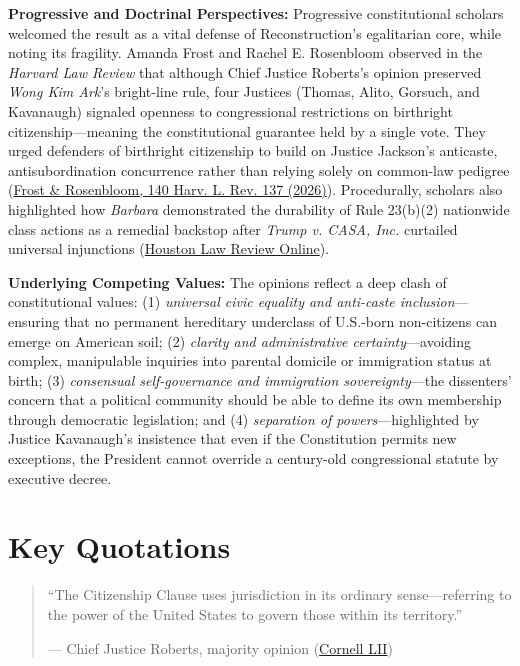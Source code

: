 \documentclass[12pt]{article}
\begin{document}
\textbf{Progressive and Doctrinal Perspectives:} Progressive constitutional scholars welcomed the result as a vital defense of Reconstruction's egalitarian core, while noting its fragility. Amanda Frost and Rachel E. Rosenbloom observed in the \textit{Harvard Law Review} that although Chief Justice Roberts's opinion preserved \textit{Wong Kim Ark}'s bright-line rule, four Justices (Thomas, Alito, Gorsuch, and Kavanaugh) signaled openness to congressional restrictions on birthright citizenship---meaning the constitutional guarantee held by a single vote. They urged defenders of birthright citizenship to build on Justice Jackson's anticaste, antisubordination concurrence rather than relying solely on common-law pedigree (\href{https://www.law.virginia.edu/node/2211356}{Frost \& Rosenbloom, 140 Harv. L. Rev. 137 (2026)}). Procedurally, scholars also highlighted how \textit{Barbara} demonstrated the durability of Rule 23(b)(2) nationwide class actions as a remedial backstop after \textit{Trump v. CASA, Inc.} curtailed universal injunctions (\href{https://houstonlawreview.org/article/171991-from-universal-injunctions-to-nationwide-classes-what-_barbara-v-trump_-reveals-about-_casa_-s-remedial-framework.pdf}{Houston Law Review Online}).

\textbf{Underlying Competing Values:} The opinions reflect a deep clash of constitutional values: (1) \textit{universal civic equality and anti-caste inclusion}---ensuring that no permanent hereditary underclass of U.S.-born non-citizens can emerge on American soil; (2) \textit{clarity and administrative certainty}---avoiding complex, manipulable inquiries into parental domicile or immigration status at birth; (3) \textit{consensual self-governance and immigration sovereignty}---the dissenters' concern that a political community should be able to define its own membership through democratic legislation; and (4) \textit{separation of powers}---highlighted by Justice Kavanaugh's insistence that even if the Constitution permits new exceptions, the President cannot override a century-old congressional statute by executive decree.

\section{Key Quotations}
\begin{quote}
``The Citizenship Clause uses jurisdiction in its ordinary sense---referring to the power of the United States to govern those within its territory.''
\begin{flushright}--- Chief Justice Roberts, majority opinion (\href{https://www.law.cornell.edu/supremecourt/text/25-365}{Cornell LII})\end{flushright}
\end{quote}
\end{document}

